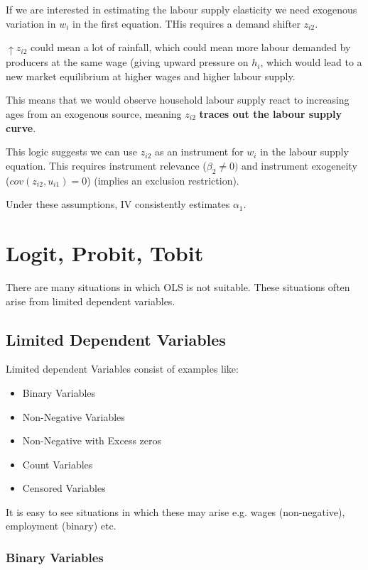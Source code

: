 \documentclass[11pt]{article}
\begin{document}
If we are interested in estimating the labour supply elasticity we need exogenous variation in $w_i$ in the first equation. THis requires a demand shifter $z_{i2}$. 
\begin{example}
    $\uparrow z_{i2}$ could mean a lot of rainfall, which could mean more labour demanded by producers at the same wage (giving upward pressure on $h_i$, which would lead to a new market equilibrium at higher wages and higher labour supply.
\end{example}

This means that we would observe household labour supply react to increasing ages from an exogenous source, meaning $z_{i2}$ \textbf{traces out the labour supply curve}.

This logic suggests we can use $z_{i2}$ as an instrument for $w_i$ in the labour supply equation. This requires instrument relevance ($\beta_2 \neq0)$ and instrument exogeneity ($cov(z_{i2},u_{i1})=0$) (implies an exclusion restriction).

Under these assumptions, IV consistently estimates $\alpha_1$.

\clearpage
\section{Logit, Probit, Tobit}

There are many situations in which OLS is not suitable. These situations often arise from limited dependent variables.

\subsection{Limited Dependent Variables}

Limited dependent Variables consist of examples like:
\begin{itemize}
    \item Binary Variables
    \item Non-Negative Variables
    \item Non-Negative with Excess zeros
    \item Count Variables
    \item Censored Variables
\end{itemize}

It is easy to see situations in which these may arise e.g. wages (non-negative), employment (binary) etc.


\subsubsection{Binary Variables}
\end{document}
